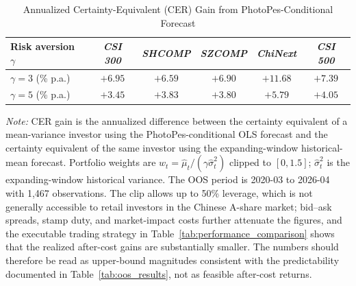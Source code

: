\documentclass[AER]{AEA}
\begin{document}
\begin{table}[h!]
    \centering
    \caption{Annualized Certainty-Equivalent (CER) Gain from PhotoPes-Conditional Forecast}
    \label{tab:oos_cer}
    \setlength{\tabcolsep}{4pt}
    \small
    \begin{tabular}{lccccc}
    \toprule
    Risk aversion $\gamma$ & \textit{CSI 300} & \textit{SHCOMP} & \textit{SZCOMP} & \textit{ChiNext} & \textit{CSI 500} \\
    \midrule
    $\gamma = 3$ (\% p.a.) & $+6.95$ & $+6.59$ & $+6.90$ & $+11.68$ & $+7.39$ \\
    $\gamma = 5$ (\% p.a.) & $+3.45$ & $+3.83$ & $+3.80$ & $+5.79$  & $+4.05$ \\
    \bottomrule
    \end{tabular}

    \vspace{0.2cm}
    \footnotesize
    \textit{Note:} CER gain is the annualized difference between the certainty equivalent of a mean-variance investor using the PhotoPes-conditional OLS forecast and the certainty equivalent of the same investor using the expanding-window historical-mean forecast. Portfolio weights are $w_t = \hat\mu_t / (\gamma \hat\sigma_t^2)$ clipped to $[0, 1.5]$; $\hat\sigma_t^2$ is the expanding-window historical variance. The OOS period is 2020-03 to 2026-04 with 1{,}467 observations. The clip allows up to 50\% leverage, which is not generally accessible to retail investors in the Chinese A-share market; bid--ask spreads, stamp duty, and market-impact costs further attenuate the figures, and the executable trading strategy in Table~\ref{tab:performance_comparison} shows that the realized after-cost gains are substantially smaller. The numbers should therefore be read as upper-bound magnitudes consistent with the predictability documented in Table~\ref{tab:oos_results}, not as feasible after-cost returns.
\end{table}









\end{document}
